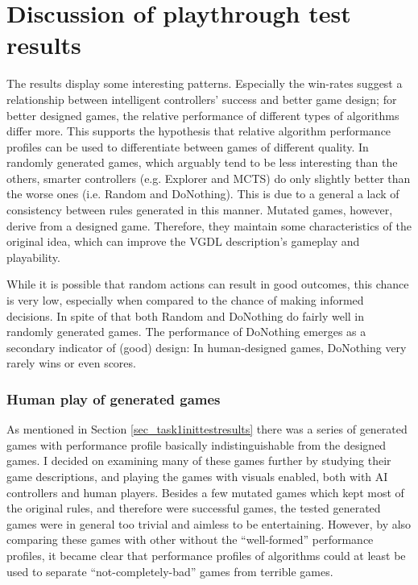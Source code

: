 \documentclass[a4paper,titlepage,final]{report}
\begin{document}
\section{Discussion of playthrough test results}
\label{sec_task1discussion}
The results display some interesting patterns. 
Especially the win-rates suggest a relationship between intelligent controllers' success and better game design; for better designed games, the relative performance of different types of algorithms differ more. 
This supports the hypothesis that relative algorithm performance profiles can be used to differentiate between games of different quality. 
In randomly generated games, which arguably tend to be less interesting than the others, smarter controllers (e.g. Explorer and MCTS) do only slightly better than the worse ones (i.e. Random and DoNothing). 
This is due to a general a lack of consistency between rules generated in this manner. 
Mutated games, however, derive from a designed game. 
Therefore, they maintain some characteristics of the original idea, which can improve the VGDL description's gameplay and playability. %

While it is possible that random actions can result in good outcomes, this chance is very low, especially when compared to the chance of making informed decisions. 
In spite of that both Random and DoNothing do fairly well in randomly generated games. 
The performance of DoNothing emerges as a secondary indicator of (good) design: 
In human-designed games, DoNothing very rarely wins or even scores.

\subsubsection*{Human play of generated games}
As mentioned in Section \ref{sec_task1inittestresults} there was a series of generated games with performance profile basically indistinguishable from the designed games.
I decided on examining many of these games further by studying their game descriptions, and playing the games with visuals enabled, both with AI controllers and human players. 
Besides a few mutated games which kept most of the original rules, and therefore were successful games, the tested generated games were in general too trivial and aimless to be entertaining.
However, by also comparing these games with other without the ``well-formed'' performance profiles, it became clear that performance profiles of algorithms could at least be used to separate ``not-completely-bad'' games from terrible games. 
\end{document}
